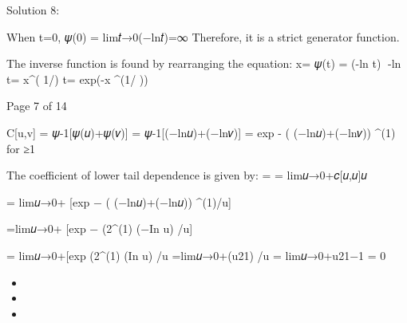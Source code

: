 Solution 8:
\item 
When t=0, 𝜓(0) = lim𝑡→0(−ln𝑡)\alpha =∞
Therefore, it is a strict generator function.

The inverse function is found by rearranging the equation:
x= 𝜓(t) = (-ln t)
-ln t= x^( 1/\alpha)
t= exp(-x ^(1/ \alpha))

Page 7 of 14

\item  
C[u,v] = 𝜓-1[𝜓(𝑢)+𝜓(𝑣)]
= 𝜓-1[(−ln𝑢)\alpha+(−ln𝑣)\alpha]
= exp {- ( (−ln𝑢)\alpha+(−ln𝑣)\alpha ) ^(1\alpha)} for \alpha≥1

The coefficient of lower tail dependence is given by:
\lambdaL = = lim𝑢→0+𝑐[𝑢,𝑢]𝑢

= lim𝑢→0+ [exp { − ( (−ln𝑢)\alpha+(−ln𝑢)\alpha ) ^(1\alpha)}/u]

=lim𝑢→0+ [exp { − (2^(1\alpha) (−In u) }/u]

= lim𝑢→0+[exp { (2^(1\alpha) (In u) }/u
 =lim𝑢→0+(u21\alpha) /u
= lim𝑢→0+u21\alpha−1
= 0 

\begin{itemize}
\item 
\item 
\item 
\end{itemize}
